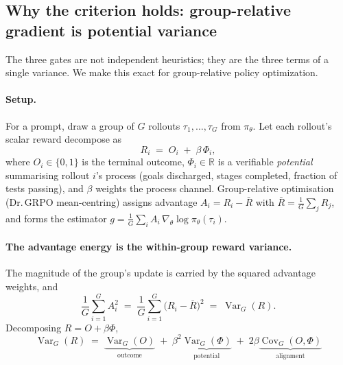 \subsection{Why the criterion holds: group-relative gradient is potential variance}
\label{sec:theorem}

The three gates are not independent heuristics; they are the three terms of a single
variance. We make this exact for group-relative policy optimization.

\paragraph{Setup.} For a prompt, draw a group of $G$ rollouts $\tau_1,\dots,\tau_G$ from
$\pi_\theta$. Let each rollout's scalar reward decompose as
\[
  R_i \;=\; O_i \;+\; \beta\,\Phi_i,
\]
where $O_i\in\{0,1\}$ is the terminal outcome, $\Phi_i\in\mathbb{R}$ is a verifiable
\emph{potential} summarising rollout $i$'s process (goals discharged, stages completed,
fraction of tests passing), and $\beta$ weights the process channel. Group-relative
optimisation (Dr.\,GRPO mean-centring) assigns advantage $A_i = R_i - \bar R$ with
$\bar R=\frac1G\sum_j R_j$, and forms the estimator
$g=\frac1G\sum_i A_i\,\nabla_\theta\log\pi_\theta(\tau_i)$.

\paragraph{The advantage energy is the within-group reward variance.}
The magnitude of the group's update is carried by the squared advantage weights, and
\[
  \frac1G\sum_{i=1}^{G} A_i^2 \;=\; \frac1G\sum_{i=1}^{G}\big(R_i-\bar R\big)^2
  \;=\; \operatorname{Var}_G(R).
\]
Decomposing $R=O+\beta\Phi$,
\begin{equation}
  \boxed{\;\operatorname{Var}_G(R) \;=\; \underbrace{\operatorname{Var}_G(O)}_{\text{outcome}}
  \;+\; \beta^2\underbrace{\operatorname{Var}_G(\Phi)}_{\text{potential}}
  \;+\; 2\beta\underbrace{\operatorname{Cov}_G(O,\Phi)}_{\text{alignment}}\;}
  \label{eq:vardecomp}
\end{equation}

